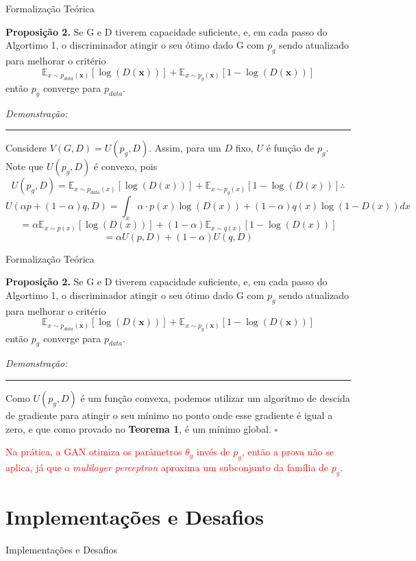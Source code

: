 \documentclass[10pt]{beamer}
\newcommand*{\QEDB}{\hfill\ensuremath{\square}}%
\begin{document}
\begin{frame}[fragile]{Formalização Teórica}
	
	\small
	\textbf{Proposição 2.} Se G e D tiverem capacidade suficiente,
	e, em cada passo do Algortimo 1, o discriminador atingir o seu
	ótimo dado G com $p_g$ sendo atualizado para melhorar o critério
    $$
    \mathbb{E}_{x\sim p_{data}(\bm x)}\left[\log{(D(\bm x))}\right]+
    \mathbb{E}_{x\sim p_g(\bm x)}\left[1-\log{(D(\bm x))}\right]
    $$
    então $p_g$ converge para $p_{data}$.

	\textit{Demonstração:}
	\hrule

	Considere $V(G,D) = U(p_g,D)$. Assim, para um $D$ fixo, $U$ é
	função de $p_g$. Note que $U(p_g,D)$ é convexo, pois
	$$ U(p_g,D) = 
    \mathbb{E}_{x\sim p_{data}(x)}\left[\log{(D(x))}\right]+
    \mathbb{E}_{x\sim p_g(x)}\left[1-\log{(D(x))}\right] \therefore
	$$
	\pause
	$$U(\alpha p + (1-\alpha)q,D) = 
	\int_x \alpha\cdot p(x)\log{(D(x))} + (1-\alpha)q(x)\log{(1-D(x))}dx
	$$
	$$
	=
    \alpha\mathbb{E}_{x\sim p(x)}\left[\log{(D(x))}\right]+
    (1-\alpha)\mathbb{E}_{x\sim q(x)}\left[1-\log{(D(x))}\right]
	$$
	$$
	= \alpha U(p,D) + (1-\alpha)U(q,D)
	$$

\end{frame}

\begin{frame}[fragile]{Formalização Teórica}
	
	\small
	\textbf{Proposição 2.} Se G e D tiverem capacidade suficiente,
	e, em cada passo do Algortimo 1, o discriminador atingir o seu
	ótimo dado G com $p_g$ sendo atualizado para melhorar o critério
    $$
    \mathbb{E}_{x\sim p_{data}(\bm x)}\left[\log{(D(\bm x))}\right]+
    \mathbb{E}_{x\sim p_g(\bm x)}\left[1-\log{(D(\bm x))}\right]
    $$
    então $p_g$ converge para $p_{data}$.

	\textit{Demonstração:}
	\hrule

	Como $U(p_g,D)$ é um função convexa, podemos utilizar um algoritmo
	de descida de gradiente para atingir o seu mínimo no ponto
	onde esse gradiente é igual a zero, e que como provado
	no \textbf{Teorema 1}, é um mínimo global.
	\QEDB
	\pause

	\textcolor{red}{Na prática, a GAN otimiza os parâmetros
	$\theta_g$ invés de $p_g$, então a prova não se aplica,
	já que o \textit{mulilayer perceptron} aproxima um subconjunto
	da família de $p_g$.}

\end{frame}

\AtBeginSection{}
\section[Desafios]{Implementações e Desafios}
\begin{frame}[fragile]{Implementações e Desafios}


\end{frame}
\end{document}
